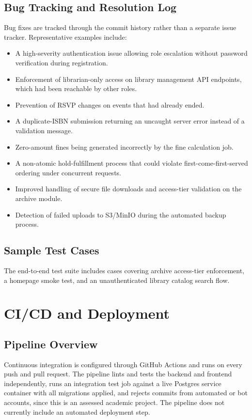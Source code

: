 \documentclass[12pt]{article}
\begin{document}
\subsection{Bug Tracking and Resolution Log}
Bug fixes are tracked through the commit history rather than a separate issue tracker. Representative examples include:
\begin{itemize}[leftmargin=1.4em]
\item A high-severity authentication issue allowing role escalation without password verification during registration.
\item Enforcement of librarian-only access on library management API endpoints, which had been reachable by other roles.
\item Prevention of RSVP changes on events that had already ended.
\item A duplicate-ISBN submission returning an uncaught server error instead of a validation message.
\item Zero-amount fines being generated incorrectly by the fine calculation job.
\item A non-atomic hold-fulfillment process that could violate first-come-first-served ordering under concurrent requests.
\item Improved handling of secure file downloads and access-tier validation on the archive module.
\item Detection of failed uploads to S3/MinIO during the automated backup process.
\end{itemize}

\subsection{Sample Test Cases}
The end-to-end test suite includes cases covering archive access-tier enforcement, a homepage smoke test, and an unauthenticated library catalog search flow.

\section{CI/CD and Deployment}

\subsection{Pipeline Overview}
Continuous integration is configured through GitHub Actions and runs on every push and pull request. The pipeline lints and tests the backend and frontend independently, runs an integration test job against a live Postgres service container with all migrations applied, and rejects commits from automated or bot accounts, since this is an assessed academic project. The pipeline does not currently include an automated deployment step.
\end{document}
